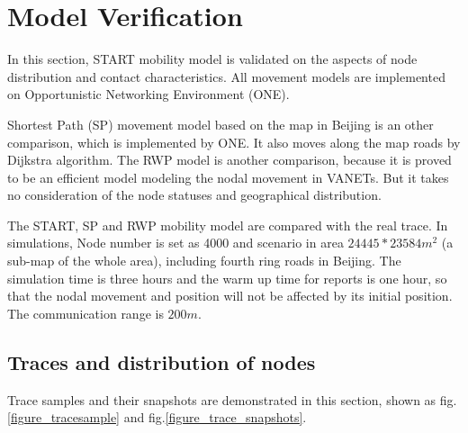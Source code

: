 \section{Model Verification}
\label{section_model_varification}
In this section, START mobility model is validated on the aspects of node distribution and contact characteristics. All movement models are implemented on Opportunistic Networking Environment (ONE)\cite{KeranenOtt-155}.

Shortest Path (SP) movement model based on the map in Beijing is an other comparison, which is implemented by ONE.  It also moves along the map roads by Dijkstra algorithm.
The RWP model is another comparison, because it is proved to be an efficient model modeling the nodal movement in VANETs. But it takes no consideration of the node statuses and geographical distribution.

The START, SP and RWP mobility model are compared with the real trace.
In simulations, Node number is set as 4000 and scenario in area $24445*23584 m^2$ (a sub-map of the whole area), including fourth ring roads in Beijing. The simulation time is three hours and the warm up time for reports is one hour, so that the nodal movement and position will not be affected by its initial position. The communication range is $200m$.

\subsection{Traces and distribution of nodes}

Trace samples and their snapshots are demonstrated in this section, shown as fig. \ref{figure_tracesample} and fig.\ref{figure_trace_snapshots}.




